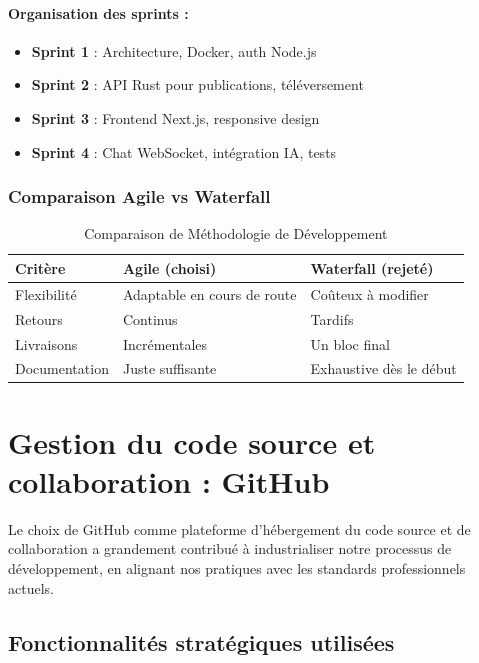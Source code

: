 \documentclass[12pt]{rapportPfe}
\begin{document}
\paragraph{Organisation des sprints :}
\begin{itemize}
    \item \textbf{Sprint 1} : Architecture, Docker, auth Node.js
    \item \textbf{Sprint 2} : API Rust pour publications, téléversement
    \item \textbf{Sprint 3} : Frontend Next.js, responsive design
    \item \textbf{Sprint 4} : Chat WebSocket, intégration IA, tests
\end{itemize}

\subsubsection{Comparaison Agile vs Waterfall}
\begin{table}[ht]
\centering
\begin{tabular}{|l|l|l|}
\hline
\textbf{Critère} & \textbf{Agile (choisi)} & \textbf{Waterfall (rejeté)} \\
\hline
Flexibilité & Adaptable en cours de route & Coûteux à modifier \\
\hline
Retours & Continus & Tardifs \\
\hline
Livraisons & Incrémentales & Un bloc final \\
\hline
Documentation & Juste suffisante & Exhaustive dès le début \\
\hline
\end{tabular}
\caption{Comparaison de Méthodologie de Développement}
\label{tab:compare-meth}
\end{table}


\section{Gestion du code source et collaboration : GitHub}

Le choix de GitHub comme plateforme d’hébergement du code source et de collaboration a grandement contribué à industrialiser notre processus de développement, en alignant nos pratiques avec les standards professionnels actuels.

\subsection{Fonctionnalités stratégiques utilisées}
\end{document}
